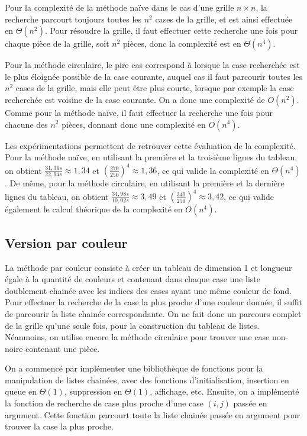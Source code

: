 \documentclass[a4paper,12pt]{article}
\numberwithin{equation}{section}
\begin{document}
Pour la complexité de la méthode naïve dans le cas d'une grille $n \times n$, la recherche parcourt toujours toutes les $n^2$ cases de la grille, et est ainsi effectuée en $\Theta(n^2)$. Pour résoudre la grille, il faut effectuer cette recherche une fois pour chaque pièce de la grille, soit $n^2$ pièces, donc la complexité est en $\Theta(n^4)$.

Pour la méthode circulaire, le pire cas correspond à lorsque la case recherchée est le plus éloignée possible de la case courante, auquel cas il faut parcourir toutes les $n^2$ cases de la grille, mais elle peut être plus courte, lorsque par exemple la case recherchée est voisine de la case courante. On a donc une complexité de $O(n^2)$. Comme pour la méthode naïve, il faut effectuer la recherche une fois pour chacune des $n^2$ pièces, donnant donc une complexité en $O(n^4)$.

Les expérimentations permettent de retrouver cette évaluation de la complexité. Pour la méthode naïve, en utilisant la première et la troisième lignes du tableau, on obtient $\frac{31,36 s}{22,94 s} \approx 1,34$ et $\left(\frac{270}{250}\right)^4 \approx 1,36$, ce qui valide la complexité en $\Theta(n^4)$. De même, pour la méthode circulaire, en utilisant la première et la dernière lignes du tableau, on obtient $\frac{34,98 s}{10,02 s} \approx 3,49$ et $\left(\frac{340}{250}\right)^4 \approx 3,42$, ce qui valide également le calcul théorique de la complexité en $O(n^4)$.

\subsection{Version par couleur}
\label{SecCouleur}

La méthode par couleur consiste à créer un tableau de dimension 1 et longueur égale à la quantité de couleurs et contenant dans chaque case une liste doublement chainée avec les indices des cases ayant une même couleur de fond. Pour effectuer la recherche de la case la plus proche d'une couleur donnée, il suffit de parcourir la liste chainée correspondante. On ne fait donc un parcours complet de la grille qu'une seule fois, pour la construction du tableau de listes. Néanmoins, on utilise encore la méthode circulaire pour trouver une case non-noire contenant une pièce.

On a commencé par implémenter une bibliothèque de fonctions pour la manipulation de listes chainées, avec des fonctions d'initialisation, insertion en queue en $\Theta(1)$, suppression en $\Theta(1)$, affichage, etc. Ensuite, on a implémenté la fonction \verb@LDC@\allowbreak\verb@rechercherPlusProcheCase@ de recherche de case plus proche d'une case $(i, j)$ passée en argument. Cette fonction parcourt toute la liste chainée passée en argument pour trouver la case la plus proche.
\end{document}
